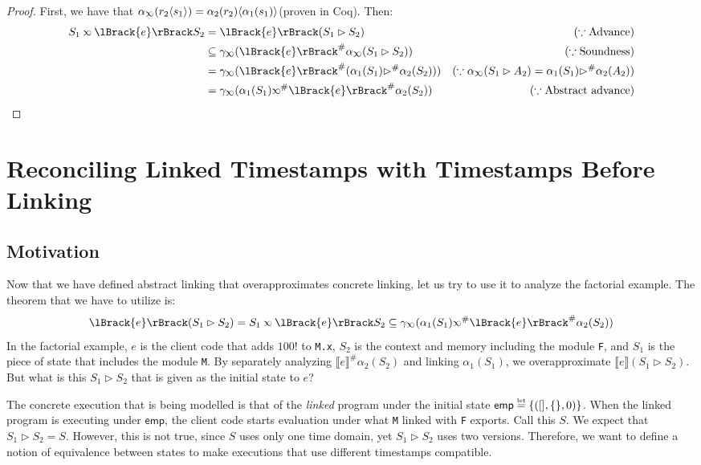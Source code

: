 \documentclass[acmsmall,screen,review]{acmart}\settopmatter{printfolios=true,printccs=false,printacmref=false}
\theoremstyle{acmdefinition}
\newcommand*{\Abs}[1]{{#1}^{\#}}
\newcommand*{\texteq}[1]{\stackrel{\mathclap{\tiny\normalfont\mbox{#1}}}{=}}
\newcommand*{\semlink}{\mathbin{\rotatebox[origin=c]{180}{$\propto$}}}
\newcommand*{\mt}{\mathsf{emp}}
\newcommand*{\sembracket}[1]{\lBrack{#1}\rBrack}
\newcommand*{\inject}[2]{{#2}\langle{#1}\rangle}
\begin{document}
\begin{proof}
  First, we have that $\alpha_{\semlink}(\inject{s_1}{r_2})=\inject{\alpha_1(s_1)}{\alpha_2(r_2)}$(proven in Coq). Then:
  \begin{align*}
    S_1\semlink\sembracket{e}S_2 & =\sembracket{e}(S_1\rhd S_2)                                                   & (\because\text{Advance})                                                    \\
                                 & \subseteq\gamma_{\semlink}(\Abs{\sembracket{e}}\alpha_{\semlink}(S_1\rhd S_2)) & (\because\text{Soundness})                                          \\
                                 & =\gamma_{\semlink}(\Abs{\sembracket{e}}(\alpha_1(S_1)\Abs\rhd\alpha_2(S_2)))   & (\because\alpha_{\semlink}(S_1\rhd A_2)=\alpha_1(S_1)\Abs\rhd\alpha_2(A_2)) \\
                                 & =\gamma_{\semlink}(\alpha_1(S_1)\Abs\semlink\Abs{\sembracket{e}}\alpha_2(S_2)) & (\because\text{Abstract advance})
  \end{align*}
\end{proof}
\section{Reconciling Linked Timestamps with Timestamps Before Linking}
\subsection{Motivation}
Now that we have defined abstract linking that overapproximates concrete linking, let us try to use it to analyze the factorial example.
The theorem that we have to utilize is:
\[\sembracket{e}(S_1\rhd S_2)=S_1\semlink\sembracket{e}S_2\subseteq\gamma_{\semlink}(\alpha_1(S_1)\Abs\semlink\Abs{\sembracket{e}}\alpha_2(S_2))\]
In the factorial example, $e$ is the client code that adds $100!$ to \texttt{M.x}, $S_2$ is the context and memory including the module \texttt{F}, and $S_1$ is the piece of state that includes the module \texttt{M}.
By separately analyzing $\Abs{\sembracket{e}}\alpha_2(S_2)$ and linking $\alpha_1(S_1)$, we overapproximate $\sembracket{e}(S_1\rhd S_2)$.
But what is this $S_1\rhd S_2$ that is given as the initial state to $e$?

The concrete execution that is being modelled is that of the \emph{linked} program under the initial state $\mt\texteq{let}\{([],\{\},0)\}$.
When the linked program is executing under $\mt$, the client code starts evaluation under what \texttt{M} linked with \texttt{F} exports.
Call this $S$.
We expect that $S_1\rhd S_2=S$.
However, this is not true, since $S$ uses only one time domain, yet $S_1\rhd S_2$ uses two versions.
Therefore, we want to define a notion of equivalence between states to make executions that use different timestamps compatible.
\end{document}
